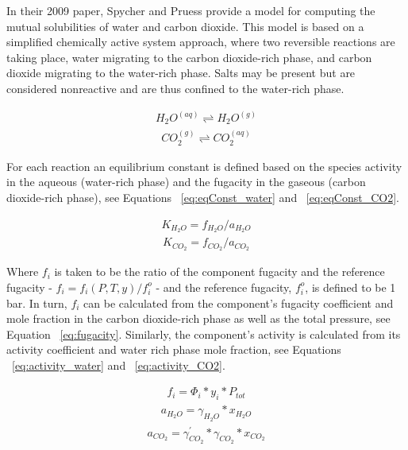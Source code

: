 In their 2009 paper, Spycher and Pruess \cite{Spycher2009} provide a model for computing the mutual solubilities of water and carbon dioxide. This model is based on a simplified chemically active system approach, where two reversible reactions are taking place, water migrating to the carbon dioxide-rich phase, and carbon dioxide migrating to the water-rich phase. Salts may be present but are considered nonreactive and are thus confined to the water-rich phase.

\begin{align} 
    H_2O^{(aq)} \rightleftharpoons H_2O^{(g)}
\end{align}
\begin{align} 
    CO_2^{(g)} \rightleftharpoons CO_2^{(aq)}
\end{align}

For each reaction an equilibrium constant is defined based on the species activity in the aqueous (water-rich phase) and the fugacity in the gaseous (carbon dioxide-rich phase), see Equations ~\eqref{eq:eqConst_water} and ~\eqref{eq:eqConst_CO2}.

\begin{align} 
    K_{H_2 O}=f_{H_2 O} / a_{H_2 O} \label{eq:eqConst_water}
\end{align}
\begin{align} 
    K_{CO_2}=f_{CO_2} / a_{CO_2} \label{eq:eqConst_CO2}
\end{align}

Where \(f_i\) is taken to be the ratio of the component fugacity and the reference fugacity - \(f_i = f_i (P,T,y)/f_i^{o}\) - and the reference fugacity, \(f_i^{o}\), is defined to be 1 bar. In turn, \(f_i\) can be calculated from the component’s fugacity coefficient and mole fraction in the carbon dioxide-rich phase as well as the total pressure, see Equation ~\eqref{eq:fugacity}. Similarly, the component’s activity is calculated from its activity coefficient and water rich phase mole fraction, see Equations ~\eqref{eq:activity_water} and ~\eqref{eq:activity_CO2}. 

\begin{align} 
    f_i= \Phi_i*y_i*P_{tot} \label{eq:fugacity}
\end{align}
\begin{align} 
   a_{H_2 O}= \gamma_{H_2 O}*x_{H_2 O} \label{eq:activity_water}
\end{align}
\begin{align} 
   a_{CO_2}= \gamma_{CO_2}^{'} * \gamma_{CO_2}*x_{CO_2} \label{eq:activity_CO2}
\end{align}

